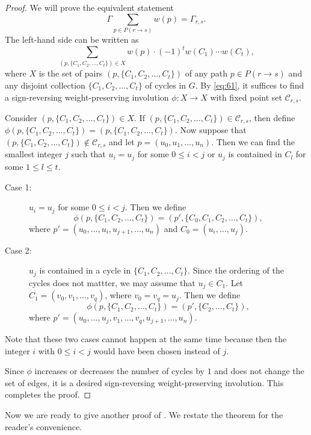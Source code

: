 \documentclass[oneside]{book}
\numberwithin{equation}{section}
\theoremstyle{definition}
\begin{document}
\begin{proof}
  We will prove the equivalent statement
  \[
     \Gamma  \sum_{p\in P(r\to s)}  w(p) = \Gamma_{r,s}.
  \]
  The left-hand side can be written as
  \[
   \sum_{(p,\{C_1, C_2,\dots,C_t\})\in X} w(p) \cdot (-1)^{t} w(C_1) \cdots w(C_t),
 \]
 where \( X \) is the set of pairs \( (p,\{C_1, C_2,\dots,C_t\}) \) of
 any path \( p\in P(r\to s) \) and any disjoint collection
 \( \{C_1, C_2,\dots,C_t\} \) of cycles in \( G \). By \eqref{eq:61},
 it suffices to find a sign-reversing weight-preserving involution
 \( \phi: X \to X \) with fixed point set \( \mathcal{C}_{r,s} \).

 Consider \( (p,\{C_1, C_2,\dots,C_t\})\in X \). If
 \( (p,\{C_1, C_2,\dots,C_t\})\in \mathcal{C}_{r,s} \), then define
 \( \phi(p,\{C_1, C_2,\dots,C_t\}) = (p,\{C_1, C_2,\dots,C_t\}) \).
 Now suppose that
 \( (p,\{C_1, C_2,\dots,C_t\})\not \in \mathcal{C}_{r,s} \) and let
 \( p = (u_0,u_1,\dots,u_n) \). Then we can find the smallest integer
 \( j \) such that \( u_i=u_j \) for some \( 0\le i<j \) or \( u_j \)
 is contained in \( C_l \) for some \( 1\le l\le t \). 

 \begin{description}
 \item[Case 1:] \( u_i=u_j \) for some \( 0\le i<j \). Then we define
   \[
     \phi(p,\{C_1, C_2,\dots,C_t\}) = (p',\{C_0,C_1, C_2,\dots,C_t\}) ,
   \]
 where \( p' = (u_0,\dots,u_i, u_{j+1},\dots,u_n) \) and
   \( C_0 = (u_i,\dots,u_j) \).
 \item[Case 2:] \( u_j \) is contained in a cycle in
   \( \{C_1, C_2,\dots,C_t\} \). Since the ordering of the cycles does
   not mattter, we may assume that \( u_j \in C_1 \). Let
   \( C_1 = (v_0,v_1,\dots,v_q) \), where \( v_0=v_q=u_j \). Then we
   define
   \[
     \phi(p,\{C_1, C_2,\dots,C_t\}) = (p',\{C_2, \dots,C_t\}) ,
   \]
 where \( p' = (u_0,\dots,u_j, v_1,\dots,v_q, u_{j+1},\dots,u_n) \).
 \end{description}
 Note that these two cases cannot happen at the same time because then
 the integer \( i \) with \( 0\le i<j \) would have been chosen
 instead of \( j \).

 Since \( \phi \) increases or decreases the number of cycles by \( 1 \)
 and does not change the set of edges, it is a desired sign-reversing
 weight-preserving involution. This completes the proof.
\end{proof}

Now we are ready to give another proof of . We restate
the theorem for the reader's convenience.
\end{document}
